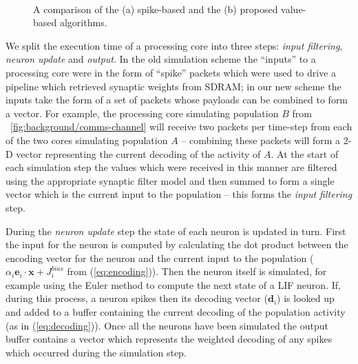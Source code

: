 \documentclass[conference]{IEEEtran}
\renewcommand{\vec}{\mathbf}  %
\begin{document}
  \begin{figure}
    \\
      \caption{A comparison of the (a) spike-based and the (b) proposed value-based algorithms.}
  \end{figure}


  We split the execution time of a processing core into three steps: \textit{input filtering}, \textit{neuron update} and \textit{output}.
  In the old simulation scheme the ``inputs'' to a processing core were in the form of ``spike'' packets which were used to drive a pipeline which retrieved synaptic weights from SDRAM; in our new scheme the inputs take the form of a set of packets whose payloads can be combined to form a vector.
  For example, the processing core simulating population $B$ from \figurename~\ref{fig:background/comms-channel} will receive two packets per time-step from each of the two cores simulating population $A$ -- combining these packets will form a 2-D vector representing the current decoding of the activity of $A$.
  At the start of each simulation step the values which were received in this manner are filtered using the appropriate synaptic filter model and then summed to form a single vector which is the current input to the population -- this forms the \textit{input filtering} step.

  During the \textit{neuron update} step the state of each neuron is updated in turn.
  First the input for the neuron is computed by calculating the dot product between the encoding vector for the neuron and the current input to the population ($\alpha_i \vec{e}_i \cdot \vec{x} + J^{bias}_i$ from (\ref{eq:encoding})).
  Then the neuron itself is simulated, for example using the Euler method to compute the next state of a LIF neuron.
  If, during this process, a neuron spikes then its decoding vector ($\vec{d}_i$) is looked up and added to a buffer containing the current decoding of the population activity (as in (\ref{eq:decoding})).
  Once all the neurons have been simulated the output buffer contains a vector which represents the weighted decoding of any spikes which occurred during the simulation step.
\end{document}
